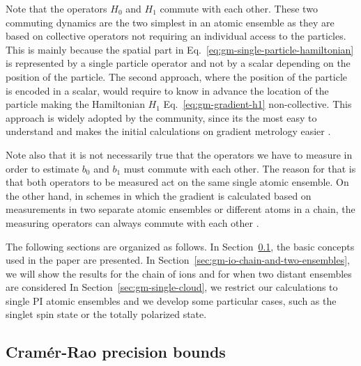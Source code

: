 Note that the operators $H_{0}$ and $H_{1}$ commute with each other.
These two commuting dynamics are the two simplest in an atomic ensemble as they are based on collective operators not requiring an individual access to the particles.
This is mainly because the spatial part in Eq.~\eqref{eq:gm-single-particle-hamiltonian} is represented by a single particle operator and not by a scalar depending on the position of the particle.
The second approach, where the position of the particle is encoded in a scalar, would require to know in advance the location of the particle making the Hamiltonian $H_1$ Eq.~\eqref{eq:gm-gradient-h1} non-collective.
This approach is widely adopted by the community, since its the most easy to understand and makes the initial calculations on gradient metrology easier \cite{}.

Note also that it is not necessarily true that the operators we have to measure in order to estimate $b_0$ and $b_1$ must commute with each other.
The reason for that is that both operators to be measured act on the same single atomic ensemble.
On the other hand, in schemes in which the gradient is calculated based on measurements in two separate atomic ensembles or different atoms in a chain, the measuring operators can always commute with each other \cite{Wasilewski2010,Eckert2006,Zhang2014}.

The following sections are organized as follows. In Section~\ref{sec:gm-cramer-rao-bounds}, the basic concepts used in the paper are presented.
In Section~\ref{sec:gm-io-chain-and-two-ensembles}, we will show the results for the chain of ions and for when two distant ensembles are considered
In Section~\ref{sec:gm-single-cloud}, we restrict our calculations to single PI atomic ensembles and we develop some particular cases, such as the singlet spin state or the totally polarized state.

\subsection{Cram\'er-Rao precision bounds}
\label{sec:gm-cramer-rao-bounds}


